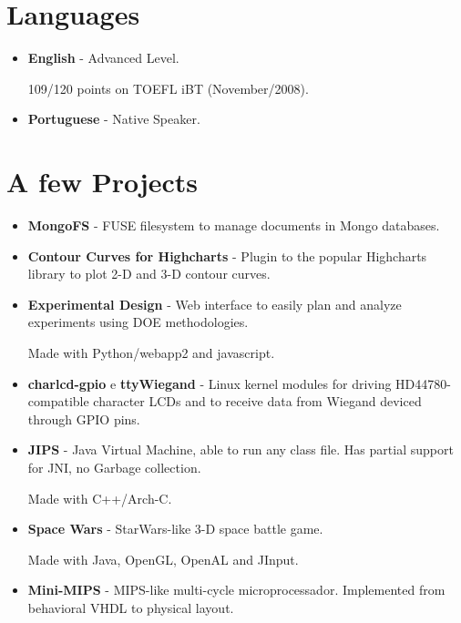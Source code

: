 \documentclass[a4paper,10pt]{article}
\begin{document}
  \section{Languages}
    \begin{itemize}
      \item  
        \textbf{English} - Advanced Level.

        109/120 points on TOEFL iBT (November/2008).

      \item  
        \textbf{Portuguese} - Native Speaker.
    \end{itemize}


  \section{A few Projects}
    \begin{itemize}
      \item 
        \textbf{MongoFS} - FUSE filesystem to manage documents in Mongo databases.
    
      \item 
        \textbf{Contour Curves for Highcharts} - Plugin to the popular Highcharts library to plot 2-D and 3-D contour curves.
      
      \item 
        \textbf{Experimental Design} - Web interface to easily plan and analyze experiments using DOE methodologies.

        Made with Python/webapp2 and javascript.
        
      \item 
        \textbf{charlcd-gpio} e \textbf{ttyWiegand} - Linux kernel modules for driving HD44780-compatible character LCDs and to receive data from Wiegand deviced through GPIO pins.

      \item 
        \textbf{JIPS} - Java Virtual Machine, able to run any class file. Has partial support for JNI, no Garbage collection.

        Made with C++/Arch-C.

      \item
        \textbf{Space Wars} - StarWars-like 3-D space battle game.

        Made with Java, OpenGL, OpenAL and JInput.
        
      \item 
        \textbf{Mini-MIPS} - MIPS-like multi-cycle microprocessador. Implemented from behavioral VHDL to physical layout.


\end{itemize}
\end{document}

